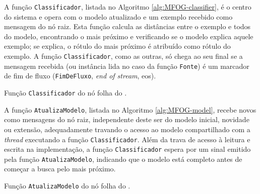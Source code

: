 A função \texttt{Classificador}, listada no Algoritmo \ref{alg:MFOG-classifier}, é o
centro do sistema e opera com o modelo atualizado e um exemplo recebido como
mensagem do nó raiz.
Esta função calcula as distâncias entre o exemplo e todos \mclusters do modelo,
encontrando o mais próximo e verificando se o modelo explica aquele exemplo; se
explica, o rótulo do \mcluster mais próximo é atribuído como rótulo do exemplo.
A função \texttt{Classificador}, como as outras, só chega ao seu final se a
mensagem recebida (ou instância lida no caso da função \texttt{Fonte}) é um
marcador de fim de fluxo (\texttt{FimDeFluxo}, \emph{end of stream}, eos).

\begin{algorithm}[htb]
    
\caption{Função \texttt{Classificador} do nó folha do \mfog.}
\label{alg:MFOG-classifier}
\end{algorithm}

A função \texttt{AtualizaModelo}, listada no Algoritmo
\ref{alg:MFOG-model}, recebe novos \mclusters como mensagens do nó raiz,
independente deste \mcluster ser do modelo inicial, novidade ou extensão,
adequadamente travando o acesso ao modelo compartilhado com a \emph{thread}
executando a função \texttt{Classificador}.
Além da trava de acesso à leitura e escrita na implementação, a função
\texttt{Classificador} espera por um sinal emitido pela função
\texttt{AtualizaModelo}, indicando que o modelo está completo antes de começar a
busca pelo \mclusters mais próximo.

\begin{algorithm}[htb]
    
\caption{Função \texttt{AtualizaModelo} do nó folha do \mfog.}
\label{alg:MFOG-model}
\end{algorithm}

